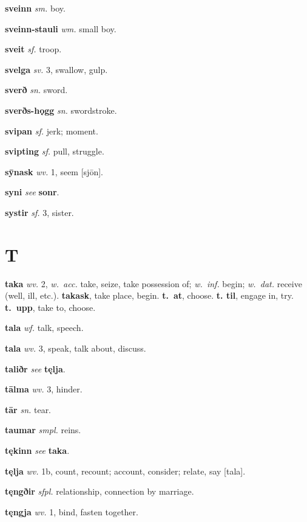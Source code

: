 \documentclass[12pt,letterpaper]{book}
\newcommand\emptypage{\clearpage{\pagestyle{empty}\cleardoublepage}}
\begin{document}
\noindent
\textbf{sveinn} \textit{sm.} boy.

\noindent
\textbf{sveinn-stauli} \textit{wm.} small boy.

\noindent
\textbf{sveit} \textit{sf.} troop.

\noindent
\textbf{svelga} \textit{sv.} 3, swallow, gulp.

\noindent
\textbf{sverð} \textit{sn.} sword.

\noindent
\textbf{sverðs-hǫgg} \textit{sn.} swordstroke.

\noindent
\textbf{svipan} \textit{sf.} jerk; moment.

\noindent
\textbf{svipting} \textit{sf.} pull, struggle.

\noindent
\textbf{sȳnask} \textit{wv.} 1, seem [sjōn].

\noindent
\textbf{syni} \textit{} \textit{see} \textbf{sonr}.

\noindent
\textbf{systir} \textit{sf.} 3, sister.

\emptypage

\chapter*{T}

\noindent
\textbf{taka} \textit{wv.} 2, \textit{w.\ acc.} take, seize, take possession
	of; \textit{w.\ inf.} begin; \textit{w.\ dat.} receive (well, ill, etc.).
	\textbf{takask}, take place, begin.  \textbf{t.\ at}, choose.  \textbf{t.
	til}, engage in, try.  \textbf{t.\ upp}, take to, choose.

\noindent
\textbf{tala} \textit{wf.} talk, speech.

\noindent
\textbf{tala} \textit{wv.} 3, speak, talk about, discuss.

\noindent
\textbf{taliðr} \textit{} \textit{see} \textbf{tęlja}.

\noindent
\textbf{tālma} \textit{wv.} 3, hinder.

\noindent
\textbf{tār} \textit{sn.} tear.

\noindent
\textbf{taumar} \textit{smpl.} reins.

\noindent
\textbf{tękinn} \textit{} \textit{see} \textbf{taka}.

\noindent
\textbf{tęlja} \textit{wv.} 1b, count, recount; account, consider; relate,
	say [tala].

\noindent
\textbf{tęngðir} \textit{sfpl.} relationship, connection by marriage.

\noindent
\textbf{tęngja} \textit{wv.} 1, bind, fasten together.
\end{document}
